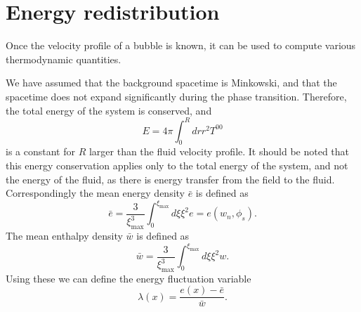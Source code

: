 \section{Energy redistribution}
\label{energy_redistribution}
Once the velocity profile of a bubble is known, it can be used to compute various thermodynamic quantities.

We have assumed that the background spacetime is Minkowski,
and that the spacetime does not expand significantly during the phase transition.
Therefore, the total energy of the system is conserved, and
\begin{equation}
E = 4 \pi \int_0^R dr r^2 T^{00}
\end{equation}
is a constant for $R$ larger than the fluid velocity profile.
It should be noted that this energy conservation applies only to the total energy of the system,
and not the energy of the fluid, as there is energy transfer from the field to the fluid.
\cite[p. 21]{lecture_notes}
Correspondingly the mean energy density $\bar{e}$ is defined as~\cite[p. 39]{lecture_notes}
\begin{equation}
\bar{e} = \frac{3}{\xi_\text{max}^3} \int_0^{\xi_\text{max}} d\xi \xi^2 e = e(w_n, \phi_s).
\label{eq:e_conservation}
\end{equation}
The mean enthalpy density $\bar{w}$ is defined as
\begin{equation}
\bar{w} = \frac{3}{\xi_\text{max}^3} \int_0^{\xi_\text{max}} d\xi \xi^2 w.
\label{eq:wbar}
\end{equation}
Using these we can define the energy fluctuation variable
\begin{equation}
\lambda(x) = \frac{e(x) - \bar{e}}{\bar{w}}.
\label{eq:lambda}
\end{equation}

